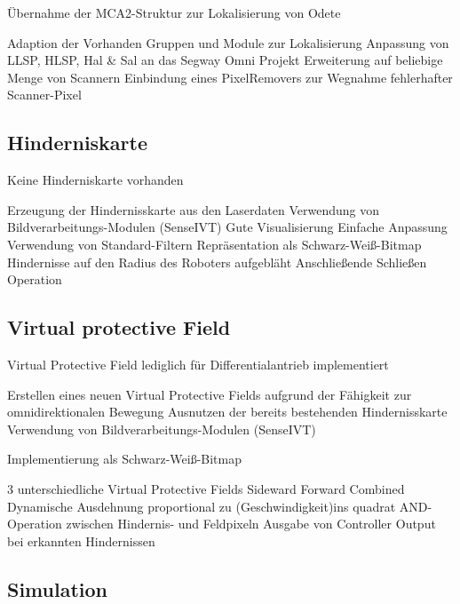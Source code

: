 Übernahme der MCA2-Struktur zur Lokalisierung von Odete

Adaption der Vorhanden Gruppen und Module zur Lokalisierung 
Anpassung von LLSP, HLSP, Hal \& Sal an das Segway Omni Projekt
Erweiterung auf beliebige Menge von Scannern
Einbindung eines PixelRemovers zur Wegnahme fehlerhafter Scanner-Pixel

\subsection{Hinderniskarte}
Keine Hinderniskarte vorhanden

Erzeugung der Hindernisskarte aus den Laserdaten
Verwendung von Bildverarbeitungs-Modulen (SenseIVT)
            Gute Visualisierung
            Einfache Anpassung
            Verwendung von Standard-Filtern
         Repräsentation als Schwarz-Weiß-Bitmap
        Hindernisse auf den Radius des Roboters aufgebläht
        Anschließende Schließen Operation
\subsection{Virtual protective Field}
Virtual Protective Field lediglich für Differentialantrieb implementiert

    Erstellen eines neuen Virtual Protective Fields aufgrund der Fähigkeit zur omnidirektionalen Bewegung
        Ausnutzen der bereits bestehenden Hindernisskarte
            Verwendung von Bildverarbeitungs-Modulen (SenseIVT)

Implementierung als Schwarz-Weiß-Bitmap

        3 unterschiedliche Virtual Protective Fields
            Sideward
            Forward
            Combined
        Dynamische Ausdehnung proportional zu (Geschwindigkeit)ins quadrat
        AND-Operation zwischen Hindernis- und Feldpixeln
        Ausgabe von Controller Output bei erkannten Hindernissen
\subsection{Simulation}
